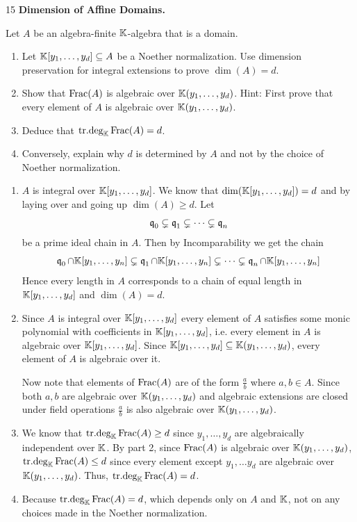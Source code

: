 \documentclass[Notebook.tex]{subfiles}
\begin{document}
\newpage 

\begin{problem}{15} \textbf{Dimension of Affine Domains.} 
    
    Let $A$ be an algebra-finite $\mathbb K$-algebra that is a domain.
    \begin{enumerate}
        \item Let $\mathbb K[y_1,\ldots,y_d]\subseteq A$ be a Noether normalization. Use dimension preservation for integral extensions to prove $\dim(A)=d$.
        \item Show that $\text{Frac}(A)$ is algebraic over $\mathbb K(y_1,\ldots,y_d)$. Hint: First prove that every element of $A$ is algebraic over $\mathbb K(y_1,\ldots,y_d)$.
        \item Deduce that $\operatorname{\text{tr.deg}}_{\mathbb K}\text{Frac}(A)=d$.
        \item Conversely, explain why $d$ is determined by $A$ and not by the choice of Noether normalization.
    \end{enumerate}
\end{problem}

\begin{solution}
    \bbni 
    \begin{enumerate}
        \item $A$ is integral over $\mathbb K[y_1, \ldots, y_d]$. We know that $\dim(\mathbb K[y_1, \ldots, y_d]) = d$ and by laying over and going up $\dim(A) \geq d$. Let 
        \[\operatorname{\mathfrak{q}}_0 \subsetneq \operatorname{\mathfrak{q}}_1 \subsetneq \cdots \subsetneq \operatorname{\mathfrak{q}}_n\]
        be a prime ideal chain in $A$. Then by Incomparability we get the chain  
        \[\operatorname{\mathfrak{q}}_0 \cap \mathbb K[y_1, \ldots, y_n] \subsetneq \operatorname{\mathfrak{q}}_1 \cap \mathbb K[y_1, \ldots, y_n]  \subsetneq \cdots \subsetneq \operatorname{\mathfrak{q}}_n \cap \mathbb K[y_1, \ldots, y_n] \]
        Hence every length in $A$ corresponds to a chain of equal length in $\mathbb K[y_1, \ldots, y_d]$ and $\dim(A) = d$. 

        \item Since $A$ is integral over $\mathbb K[y_1, \ldots, y_d]$ every element of $A$ satisfies some monic polynomial with coefficients in $\mathbb K[y_1, \ldots, y_d]$, i.e. every element in $A$ is algebraic over $\mathbb K[y_1, \ldots, y_d]$. Since $\mathbb K[y_1, \ldots, y_d] \subseteq \mathbb K(y_1, \ldots, y_d)$, every element of $A$ is algebraic over it. 
        
        Now note that elements of $\text{Frac}(A)$ are of the form $\frac{a}{b}$ where $a, b \in A$. Since both $a, b$ are algebraic over $\mathbb K(y_1, \ldots, y_d)$ and algebraic extensions are closed under field operations $\frac{a}{b}$ is also algebraic over $\mathbb K(y_1, \ldots, y_d)$. 

        \item We know that $\operatorname{\text{tr.deg}}_{\mathbb K}\text{Frac}(A) \geq d$ since $y_1, \ldots, y_d$ are algebraically independent over $\mathbb K$. By part 2, since $\text{Frac}(A)$ is algebraic over $\mathbb K(y_1, \ldots, y_d)$, $\operatorname{\text{tr.deg}}_{\mathbb K} \text{Frac}(A) \leq d$ since every element except $y_1, \ldots y_d$ are algebraic over $\mathbb K(y_1, \ldots, y_d)$. Thus, $\operatorname{\text{tr.deg}}_{\mathbb K}\text{Frac}(A)=d$.
 
        \item Because $\operatorname{\text{tr.deg}}_{\mathbb K}\text{Frac}(A) = d$, which depends only on $A$ and $\mathbb K$, not on any choices made in the Noether normalization. 
    \end{enumerate}
\end{solution}
\end{document}
